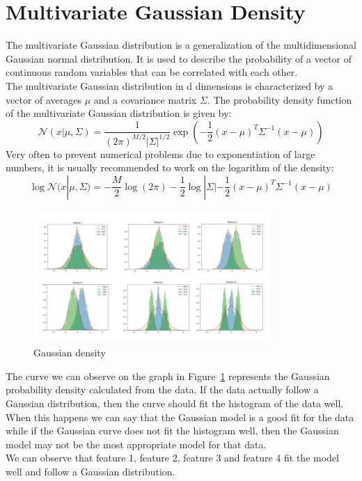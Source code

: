 \documentclass{article}
\begin{document}
\section{Multivariate Gaussian Density}
The multivariate Gaussian distribution is a generalization of the multidimensional Gaussian normal distribution. It is used to describe the probability of a vector of continuous random variables that can be correlated with each other.\\
The multivariate Gaussian distribution in d dimensions is characterized by a vector of averages \(\mu\)  and a covariance matrix \(\Sigma\). The probability density function of the multivariate Gaussian distribution is given by:
\begin{equation}
    \mathcal{N}(x|\mu,\Sigma ) = \frac{1}{(2\pi)^{M/2}|\Sigma|^{1/2}} \exp\left(-\frac{1}{2}(x-\mu)^T\Sigma^{-1}(x-\mu)\right)
\end{equation}
Very often to prevent numerical problems due to exponentiation of large numbers, it is usually recommended to work on the logarithm of the density:
\begin{equation}
    \log \mathcal{N}(x|\mu,\Sigma ) = - \frac{M}{2} \log(2\pi) -\frac{1}{2} \log |\Sigma| - \frac{1}{2}(x-\mu)^T\Sigma^{-1}(x-\mu) 
\end{equation}
\begin{figure}[H]
    \centering
    \includegraphics[width=0.8\textwidth]{./img/GaussianDensity.jpeg}
    \caption{Gaussian density}
    \label{fig:gaussianD}
\end{figure} 
The curve we can observe on the graph in Figure~\ref{fig:gaussianD} represents the Gaussian probability density calculated from the data. If the data actually follow a Gaussian distribution, then the curve should fit the histogram of the data well. When this happens we can say that the Gaussian model is a good fit for the data while if the Gaussian curve does not fit the histogram well, then the Gaussian model may not be the most appropriate model for that data.\\
We can observe that feature 1, feature 2, feature 3 and feature 4 fit the model well and follow a Gaussian distribution.
\end{document}
